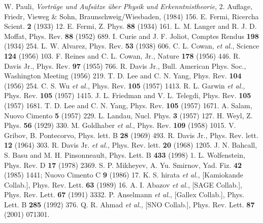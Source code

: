 \begin{thebibliography}{99}
W. Pauli, \emph{Vortr\"age und Aufs\"atze \"uber Physik     und Erkenntnistheorie}, 2. Auflage, Friedr, Vieweg \& Sohn,   Braunschweig/Wiesbaden, (1984) 156.
E. Fermi, Ricercha Scient. \textbf{2} (1933) 12.
E. Fermi, Z. Phys. \textbf{88} (1934) 161.
L. M. Langer and R. J. D. Moffat, Phys. Rev.   \textbf{88} (1952) 689.
I. Curie and J. F. Joliot, Comptes Rendus \textbf{198}   (1934) 254.
L. W. Alvarez, Phys. Rev. \textbf{53} (1938) 606.
 C. L. Cowan, \textit{et al.}, Science \textbf{124}   (1956) 103.
F. Reines and C. L. Cowan, Jr., Nature \textbf{178} (1956) 446.
R. Davis Jr., Phys. Rev. \textbf{97} (1955) 766.
R. Davis Jr., Bull. American Phys. Soc., Washington   Meeting (1956) 219.
T. D. Lee and C. N. Yang, Phys. Rev. \textbf{104}  
(1956) 254.
C. S. Wu \textit{et al.}, Phys. Rev. \textbf{105} (1957)  
1413.
R. L. Garwin \textit{et al.}, Phys. Rev. \textbf{105}  
(1957) 1415.
J. L. Friedman and V. L. Telegdi, Phys. Rev.  
\textbf{105} (1957) 1681.
T. D. Lee and C. N. Yang, Phys. Rev. \textbf{105}   (1957) 1671.
A. Salam, Nuovo Cimento \textbf{5} (1957) 229.
L. Landau, Nucl. Phys. \textbf{3} (1957) 127.
H. Weyl, Z. Phys. \textbf{56} (1929) 330.
M. Goldhaber \textit{et al.}, Phys. Rev. \textbf{109}   (1958) 1015.
V. Gribov, B. Pontecorvo, Phys. lett. B \textbf{28}   (1969) 493.
R. Davis Jr., Phys. Rev. lett. \textbf{12} (1964) 303.
R. Davis Jr. \textit{et al.}, Phys. Rev. lett.   \textbf{20} (1968) 1205.
J. N. Bahcall, S. Basu and M. H. Pinsonneault, Phys.   Lett. B \textbf{433} (1998) 1.
L. Wolfenstein, Phys. Rev. D \textbf{17} (1978) 2369.
S. P. Mikheyev, A. Yu. Smirnov, Yad. Fiz. \textbf{42}  
(1985) 1441; Nuovo Cimento C \textbf{9} (1986) 17.
K. S. hirata \textit{et al.}, [Kamiokande Collab.],   Phys. Rev. Lett. \textbf{63} (1989) 16.
A. I. Abazov \textit{et al.}, [SAGE Collab.], Phys.   Rev. Lett. \textbf{67} (1991) 3332.
P. Anselmann \textit{et al.}, [Gallex Collab.], Phys.   Lett. B \textbf{285} (1992) 376.
Q. R. Ahmad \textit{et al.}, [SNO Collab.], Phys. Rev.   Lett. \textbf{87} (2001) 071301.

\end{thebibliography}
